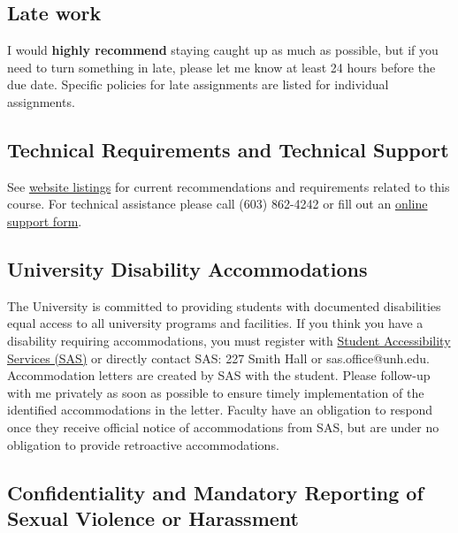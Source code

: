 \documentclass[
  letterpaper,
  DIV=11,
  numbers=noendperiod]{scrreprt}
\begin{document}
\hypertarget{late-work}{%
\subsection*{Late work}\label{late-work}}

I would \textbf{highly recommend} staying caught up as much as possible,
but if you need to turn something in late, please let me know at least
24 hours before the due date. Specific policies for late assignments are
listed for individual assignments.

\hypertarget{technical-requirements-and-technical-support}{%
\subsection*{Technical Requirements and Technical
Support}\label{technical-requirements-and-technical-support}}

See \href{https://online.unh.edu/technical-requirements}{website
listings} for current recommendations and requirements related to this
course. For technical assistance please call (603) 862-4242 or fill out
an \href{https://itsupport.unh.edu/onlinelearning/}{online support
form}.

\hypertarget{university-disability-accommodations}{%
\subsection*{University Disability
Accommodations}\label{university-disability-accommodations}}

The University is committed to providing students with documented
disabilities equal access to all university programs and facilities. If
you think you have a disability requiring accommodations, you must
register with \href{http://www.unh.edu/studentaccessibility}{Student
Accessibility Services (SAS)} or directly contact SAS: 227 Smith Hall or
sas.office@unh.edu. Accommodation letters are created by SAS with the
student. Please follow-up with me privately as soon as possible to
ensure timely implementation of the identified accommodations in the
letter. Faculty have an obligation to respond once they receive official
notice of accommodations from SAS, but are under no obligation to
provide retroactive accommodations.

\hypertarget{confidentiality-and-mandatory-reporting-of-sexual-violence-or-harassment}{%
\subsection*{Confidentiality and Mandatory Reporting of Sexual Violence
or
Harassment}\label{confidentiality-and-mandatory-reporting-of-sexual-violence-or-harassment}}
\end{document}
